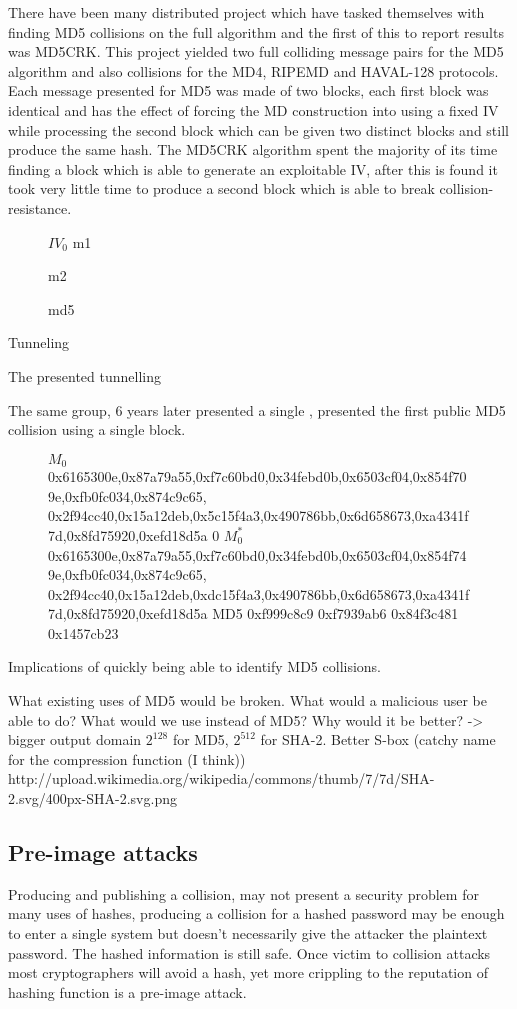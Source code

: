 \documentclass[a4paper,12pt]{article}
\begin{document}
There have been many distributed project which have tasked themselves with finding MD5 collisions on the full algorithm and the first of this to report results was MD5CRK\cite{cryptoeprint:2004:199}. This project yielded two full colliding message pairs for the MD5 algorithm and also collisions for the MD4, RIPEMD and HAVAL-128 protocols. Each message presented for MD5 was made of two blocks, each first block was identical and has the effect of forcing the MD construction into using a fixed IV while processing the second block which can be given two distinct blocks and still produce the same hash. The MD5CRK algorithm spent the majority of its time finding a block which is able to generate an exploitable IV, after this is found it took very little time to produce a second block which is able to break collision-resistance.
\begin{figure}
	$IV_0$
	m1

	m2

	md5
\caption{}
\end{figure}

Tunneling

The  \cite{Klima2006} presented tunnelling 

The same group, 6 years later presented a single \cite{Xie2013}, presented the first public MD5 collision using a single block.
\begin{figure}
$M_0$
0x6165300e,0x87a79a55,0xf7c60bd0,0x34febd0b,0x6503cf04,0x854f709e,0xfb0fc034,0x874c9c65, 0x2f94cc40,0x15a12deb,0x5c15f4a3,0x490786bb,0x6d658673,0xa4341f7d,0x8fd75920,0xefd18d5a
0
$M_0^*$
0x6165300e,0x87a79a55,0xf7c60bd0,0x34febd0b,0x6503cf04,0x854f749e,0xfb0fc034,0x874c9c65, 0x2f94cc40,0x15a12deb,0xdc15f4a3,0x490786bb,0x6d658673,0xa4341f7d,0x8fd75920,0xefd18d5a
MD5 0xf999c8c9 0xf7939ab6 0x84f3c481 0x1457cb23

\end{figure}

Implications of quickly being able to identify MD5 collisions.

What existing uses of MD5 would be broken. What would a malicious user be able to do?
What would we use instead of MD5?
Why would it be better? -> bigger output domain $2^128$ for MD5, $2^512$ for SHA-2.
Better S-box (catchy name for the compression function (I think)) http://upload.wikimedia.org/wikipedia/commons/thumb/7/7d/SHA-2.svg/400px-SHA-2.svg.png



\subsection{Pre-image attacks}
Producing and publishing a collision, may not present a security problem for many uses of hashes, producing a collision for a hashed password may be enough to enter a single system but doesn't necessarily give the attacker the plaintext password. The hashed information is still safe. Once victim to collision attacks most cryptographers will avoid a hash\cite{dontusemd5}, yet more crippling to the reputation of hashing function is a pre-image attack.
\end{document}
